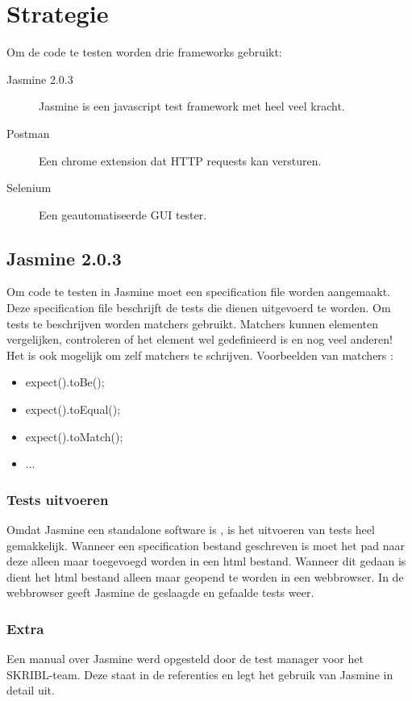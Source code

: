 \documentclass{article}
\begin{document}
\section{Strategie}
Om de code te testen worden drie frameworks gebruikt: 
\begin{description}
  \item[Jasmine 2.0.3] Jasmine is een javascript test framework met heel veel kracht.
  \item[Postman] Een chrome extension dat HTTP requests kan versturen. 
  \item[Selenium] Een geautomatiseerde GUI tester.
\end{description}
 
\subsection{Jasmine 2.0.3}
Om code te testen in Jasmine moet een specification file worden aangemaakt. Deze specification file beschrijft de tests die dienen uitgevoerd te worden. 
\newline
Om tests te beschrijven worden matchers gebruikt. Matchers kunnen elementen vergelijken, controleren of het element wel gedefinieerd is en nog veel anderen! Het is ook mogelijk om zelf matchers te schrijven.
Voorbeelden van matchers :
\begin{itemize}
  \item expect().toBe();
  \item expect().toEqual();
  \item expect().toMatch();
  \item ...
\end{itemize}

\subsubsection{Tests uitvoeren}
Omdat Jasmine een standalone software is , is het uitvoeren van tests heel gemakkelijk. Wanneer een specification bestand geschreven is moet het pad naar deze alleen maar toegevoegd worden in een html bestand. Wanneer dit gedaan is dient het html bestand alleen maar geopend te worden in een webbrowser. In de webbrowser geeft Jasmine de geslaagde en gefaalde tests weer.

\subsubsection{Extra}
Een manual over Jasmine werd opgesteld door de test manager voor het SKRIBL-team. Deze staat in de referenties en legt het gebruik van Jasmine in detail uit.
\end{document}
